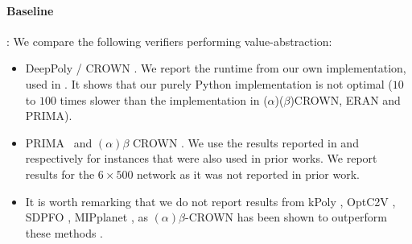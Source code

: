 \paragraph{Baseline}: 
We compare the following verifiers performing value-abstraction:
\begin{itemize}
	\item DeepPoly \cite{deeppoly}/ CROWN \cite{crown}. We report the runtime from our own implementation, used in {\toolname}. It shows that our purely Python implementation is not optimal ($10$ to $100$ times slower than the implementation in ($\alpha$)($\beta$)CROWN, ERAN and PRIMA). 
	\item PRIMA~\cite{prima} and $(\alpha)\beta$ CROWN \cite{crown}. We use the results reported in \cite{prima} and \cite{crown} respectively for instances that were also used in prior works.
	We report results for the $6\times500$ network as it was not reported in prior work.  
	
	\item It is worth remarking that we do not report results from kPoly \cite{kpoly}, OptC2V \cite{optC2V}, 
	SDPFO \cite{SDPFI}, MIPplanet \cite{MIPplanet}, as $(\alpha)\beta$-CROWN has been shown to outperform these methods \cite{crown}.
	
\end{itemize}



